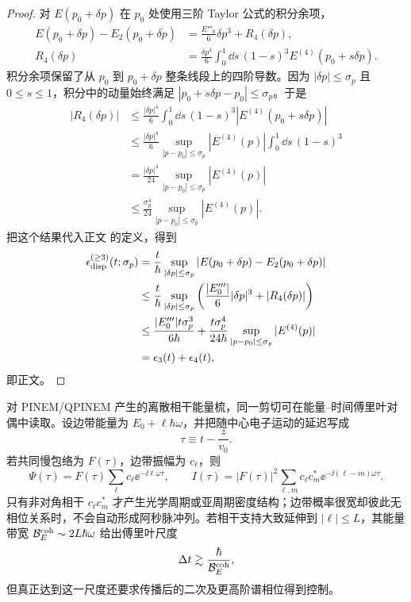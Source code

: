\begin{proof}
对 $E(p_0+\delta p)$ 在 $p_0$ 处使用三阶 Taylor 公式的积分余项，
\begin{align*}
E(p_0+\delta p)-E_2(p_0+\delta p)
&=\frac{E'''_0}{6}\delta p^3+R_4(\delta p),\\
R_4(\delta p)
&=\frac{\delta p^4}{6}
\int_0^1\dd s\,(1-s)^3
E^{(4)}(p_0+s\delta p).
\end{align*}
积分余项保留了从 $p_0$ 到 $p_0+\delta p$ 整条线段上的四阶导数。因为 $|\delta p|\le\sigma_p$ 且 $0\le s\le1$，积分中的动量始终满足 $|p_0+s\delta p-p_0|\le\sigma_p$。于是
\begin{align*}
|R_4(\delta p)|
&\le\frac{|\delta p|^4}{6}
\int_0^1\dd s\,(1-s)^3
\left|E^{(4)}(p_0+s\delta p)\right|\\
&\le\frac{|\delta p|^4}{6}
\sup_{|p-p_0|\le\sigma_p}|E^{(4)}(p)|
\int_0^1\dd s\,(1-s)^3\\
&=\frac{|\delta p|^4}{24}
\sup_{|p-p_0|\le\sigma_p}|E^{(4)}(p)|\\
&\le\frac{\sigma_p^4}{24}
\sup_{|p-p_0|\le\sigma_p}|E^{(4)}(p)|.
\end{align*}
把这个结果代入正文 的定义，得到
\begin{align*}
\epsilon_{\rm disp}^{(\ge3)}(t;\sigma_p)
&=\frac{t}{\hbar}
\sup_{|\delta p|\le\sigma_p}
\left|E(p_0+\delta p)-E_2(p_0+\delta p)\right|\\
&\le
\frac{t}{\hbar}
\sup_{|\delta p|\le\sigma_p}
\left(\frac{|E'''_0|}{6}|\delta p|^3+|R_4(\delta p)|\right)\\
&\le
\frac{|E'''_0|t\sigma_p^3}{6\hbar}
+\frac{t\sigma_p^4}{24\hbar}
\sup_{|p-p_0|\le\sigma_p}|E^{(4)}(p)|\\
&=\epsilon_3(t)+\epsilon_4(t),
\end{align*}
即正文。
\end{proof}


对 PINEM/QPINEM 产生的离散相干能量梳，同一剪切可在能量--时间傅里叶对偶中读取。设边带能量为 $E_0+\ell\hbar\omega$，并把随中心电子运动的延迟写成
\[
\tau\equiv t-\frac{z}{v_0}.
\]
若共同慢包络为 $F(\tau)$，边带振幅为 $c_\ell$，则
\begin{equation}
{
\Psi(\tau)=F(\tau)\sum_\ell c_\ell\ee^{-\ii\ell\omega\tau},
\qquad
I(\tau)=|F(\tau)|^2
\sum_{\ell,m}c_\ell c_m^*\ee^{-\ii(\ell-m)\omega\tau}.}
\label{eq:coherent_energy_comb_time_amplitude}
\end{equation}
只有非对角相干 $c_\ell c_m^*$ 才产生光学周期或亚周期密度结构；边带概率很宽却彼此无相位关系时，不会自动形成阿秒脉冲列。若相干支持大致延伸到 $|\ell|\le L$，其能量带宽 $\mathcal B_E^{\rm coh}\sim2L\hbar\omega$ 给出傅里叶尺度
\[
\Delta t\gtrsim\frac{\hbar}{\mathcal B_E^{\rm coh}},
\]
但真正达到这一尺度还要求传播后的二次及更高阶谱相位得到控制。

